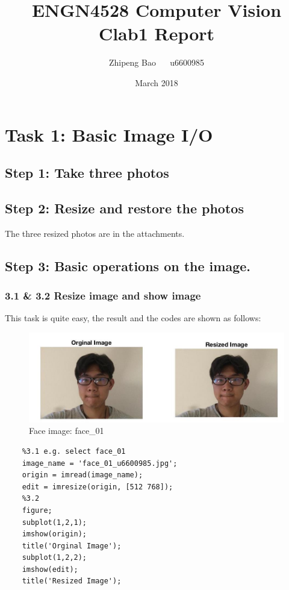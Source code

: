 \documentclass{article}
\title{ENGN4528 Computer Vision Clab1 Report}
\author{Zhipeng Bao ~~ u6600985}
\date{March 2018}
\begin{document}
\maketitle

\section{Task 1: Basic Image I/O}
\subsection*{Step 1: Take three photos}
\subsection*{Step 2: Resize and restore the photos}
The three resized photos are in the attachments. 
\subsection*{Step 3: Basic operations on the image.}
\subsubsection*{3.1 \& 3.2 Resize image and show image}
This task is quite easy, the result and the codes are shown as follows:

\begin{figure}[htbp]
    \centering
    \includegraphics[scale = 0.3]{fig1.jpg}
    \caption{Face image: face\_01}
    \label{fig1}
\end{figure}

\begin{lstlisting}
    %3.1 e.g. select face_01
    image_name = 'face_01_u6600985.jpg';
    origin = imread(image_name);
    edit = imresize(origin, [512 768]);
    %3.2
    figure;
    subplot(1,2,1);
    imshow(origin);
    title('Orginal Image');
    subplot(1,2,2);
    imshow(edit);
    title('Resized Image');
\end{lstlisting}
\end{document}
